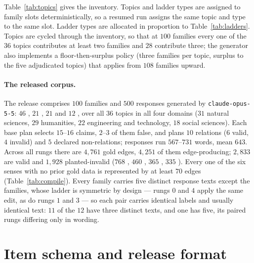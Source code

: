 Table~\ref{tab:topics} gives the inventory. Topics and ladder types are assigned to family slots
deterministically, so a resumed run assigns the same topic and type to the same slot. Ladder types are
allocated in proportion to Table~\ref{tab:ladders}. Topics are cycled through the inventory, so that at
$100$ families every one of the $36$ topics contributes at least two families and $28$ contribute three;
the generator also implements a floor-then-surplus policy (three families per topic, surplus to the five
adjudicated topics) that applies from $108$ families upward.

\paragraph{The released corpus.} The release comprises $100$ families and $500$ responses generated by
\texttt{claude-opus-5-5}: $46$ , $21$ , $21$  and $12$
, over all $36$ topics in all four domains ($31$ natural sciences, $29$ humanities, $22$
engineering and technology, $18$ social sciences). Each base plan selects $15$--$16$ claims, $2$--$3$ of them
false, and plans $10$ relations ($6$ valid, $4$ invalid) and $5$ declared non-relations; responses run
$567$--$731$ words, mean $643$. Across all rungs there are $4{,}761$ gold edges, $4{,}251$ of them
edge-producing; $2{,}833$ are valid and $1{,}928$ planted-invalid ($768$ , $460$
, $365$ , $335$ ). Every one of the six senses with
no prior gold data is represented by at least $70$ edges (Table~\ref{tab:compile}). Every family carries
five distinct response texts except the  families, whose ladder is symmetric by design ---
rungs $0$ and $4$ apply the same edit, as do rungs $1$ and $3$ --- so each pair carries identical labels and
usually identical text: $11$ of the $12$ have three distinct texts, and one has five, its paired rungs
differing only in wording.

\section{Item schema and release format}
\label{sec-schema}

